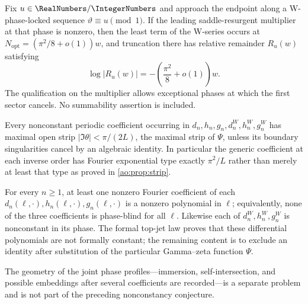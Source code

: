 \begin{conjecture}
\label{ao:conj:optimal-truncation}
Fix $u\in\RealNumbers/\IntegerNumbers$ and approach the endpoint along a
W-phase-locked sequence $\vartheta\equiv u\pmod1$.  If the leading
saddle-resurgent multiplier at that phase is nonzero, then the least term of
the W-series occurs at
$N_{\mathrm{opt}}=(\pi^2/8+o(1))w$, and truncation there has relative
remainder $R_u(w)$ satisfying
\[
 \log|R_u(w)|=-\left(\frac{\pi^2}{8}+o(1)\right)w.
\]
The qualification on the multiplier allows exceptional phases at which the
first sector cancels.  No summability assertion is included.
\end{conjecture}

\begin{conjecture}
\label{ao:conj:strip-sharp}
Every nonconstant periodic coefficient occurring in
$d_n,h_n,g_n,d_n^W,h_n^W,g_n^W$ has maximal open strip
$|\Im\theta|<\pi/(2L)$, the maximal strip of $\Psi$, unless its boundary
singularities cancel by an algebraic identity.  In particular the generic
coefficient at each inverse order has Fourier exponential type exactly
$\pi^2/L$ rather than merely at least that type as proved in
\cref{ao:prop:strip}.
\end{conjecture}

\begin{conjecture}
\label{ao:conj:nonconstant-phase}
For every $n\ge1$, at least one nonzero Fourier coefficient of each
$d_n(\ell,\cdot),h_n(\ell,\cdot),g_n(\ell,\cdot)$ is a nonzero polynomial in
$\ell$; equivalently, none of the three coefficients is phase-blind for all
$\ell$.  Likewise each of $d_n^W,h_n^W,g_n^W$ is nonconstant in its phase.
The formal top-jet law proves that these differential polynomials are not
formally constant; the remaining content is to exclude an identity after
substitution of the particular Gamma--zeta function $\Psi$.
\end{conjecture}

The geometry of the joint phase profiles---immersion, self-intersection, and
possible embeddings after several coefficients are recorded---is a separate
problem and is not part of the preceding nonconstancy conjecture.

